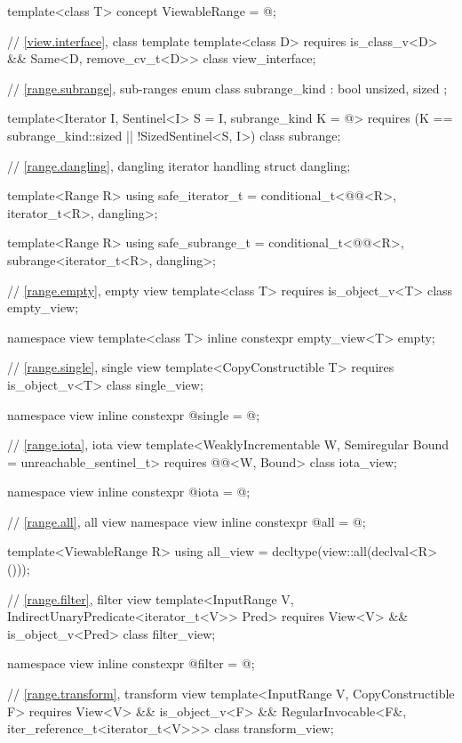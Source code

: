 \begin{codeblock}
{  template<class T>
    concept ViewableRange = @\seebelow@;

  // \ref{view.interface}, class template 
  template<class D>
    requires is_class_v<D> && Same<D, remove_cv_t<D>>
  class view_interface;

  // \ref{range.subrange}, sub-ranges
  enum class subrange_kind : bool { unsized, sized };

  template<Iterator I, Sentinel<I> S = I, subrange_kind K = @\seebelow@>
    requires (K == subrange_kind::sized || !SizedSentinel<S, I>)
  class subrange;

  // \ref{range.dangling}, dangling iterator handling
  struct dangling;

  template<Range R>
    using safe_iterator_t = conditional_t<@@<R>, iterator_t<R>, dangling>;

  template<Range R>
    using safe_subrange_t = conditional_t<@@<R>, subrange<iterator_t<R>, dangling>;

  // \ref{range.empty}, empty view
  template<class T>
    requires is_object_v<T>
  class empty_view;

  namespace view {
    template<class T>
      inline constexpr empty_view<T> empty{};
  }

  // \ref{range.single}, single view
  template<CopyConstructible T>
    requires is_object_v<T>
  class single_view;

  namespace view { inline constexpr @\unspec@ single = @\unspec@; }

  // \ref{range.iota}, iota view
  template<WeaklyIncrementable W, Semiregular Bound = unreachable_sentinel_t>
    requires @@<W, Bound>
  class iota_view;

  namespace view { inline constexpr @\unspec@ iota = @\unspec@; }

  // \ref{range.all}, all view
  namespace view { inline constexpr @\unspec@ all = @\unspec@; }

  template<ViewableRange R>
    using all_view = decltype(view::all(declval<R>()));

  // \ref{range.filter}, filter view
  template<InputRange V, IndirectUnaryPredicate<iterator_t<V>> Pred>
    requires View<V> && is_object_v<Pred>
  class filter_view;

  namespace view { inline constexpr @\unspec@ filter = @\unspec@; }

  // \ref{range.transform}, transform view
  template<InputRange V, CopyConstructible F>
    requires View<V> && is_object_v<F> &&
             RegularInvocable<F&, iter_reference_t<iterator_t<V>>>
  class transform_view;

}
\end{codeblock}
